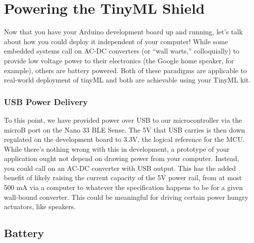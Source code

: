 %
%
%



    
\chapter{Powering the TinyML Shield}

Now that you have your Arduino development board up and running, let's talk about how you could deploy it independent of your computer! While some embedded systems call on AC-DC converters (or “wall warts,” colloquially) to provide low voltage power to their electronics (the Google home speaker, for example), others are battery powered. Both of these paradigms are applicable to real-world deployment of tinyML and both are achievable using your TinyML kit.

\subsection{USB Power Delivery}

To this point, we have provided power over USB to our microcontroller via the microB port on the Nano 33 BLE Sense. The 5V that USB carries is then down regulated on the development board to 3.3V, the logical reference for the MCU. While there’s nothing wrong with this in development, a prototype of your application ought not depend on drawing power from your computer. Instead, you could call on an AC-DC converter with USB output. This has the added benefit of likely raising the current capacity of the 5V power rail, from at most 500 mA via a computer to whatever the specification happens to be for a given wall-bound converter. This could be meaningful for driving certain power hungry actuators, like speakers.

\section{Battery}

